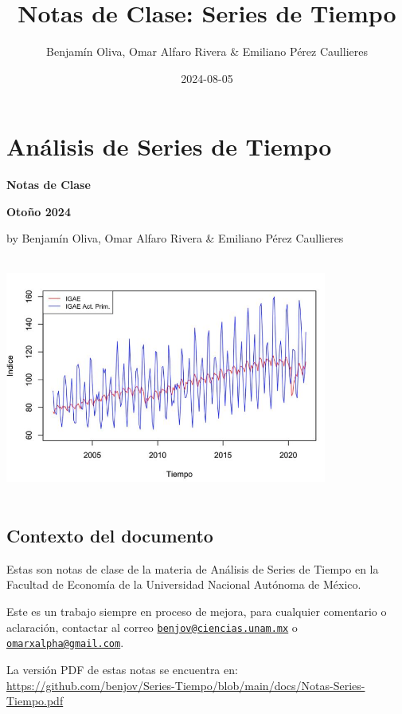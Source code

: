 \documentclass[
]{book}
\title{Notas de Clase: Series de Tiempo}
\author{Benjamín Oliva, Omar Alfaro Rivera \& Emiliano Pérez Caullieres}
\date{2024-08-05}
\begin{document}
\maketitle

{
\setcounter{tocdepth}{1}
\tableofcontents
}
\hypertarget{anuxe1lisis-de-series-de-tiempo}{%
\chapter*{Análisis de Series de Tiempo}\label{anuxe1lisis-de-series-de-tiempo}}

\textbf{Notas de Clase}

\textbf{Otoño 2024}

by Benjamín Oliva, Omar Alfaro Rivera \& Emiliano Pérez Caullieres

\includegraphics[width=4.16667in,height=3.125in]{Portada.png}

\hypertarget{contexto-del-documento}{%
\section*{Contexto del documento}\label{contexto-del-documento}}

Estas son notas de clase de la materia de Análisis de Series de Tiempo en la Facultad de Economía de la Universidad Nacional Autónoma de México.

Este es un trabajo siempre en proceso de mejora, para cualquier comentario o aclaración, contactar al correo \href{mailto:benjov@ciencias.unam.mx}{\nolinkurl{benjov@ciencias.unam.mx}} o \href{mailto:omarxalpha@gmail.com}{\nolinkurl{omarxalpha@gmail.com}}.

La versión PDF de estas notas se encuentra en: \url{https://github.com/benjov/Series-Tiempo/blob/main/docs/Notas-Series-Tiempo.pdf}
\end{document}
